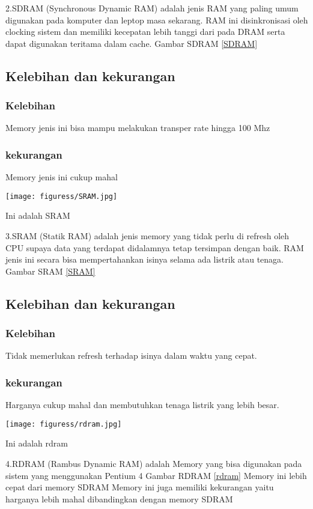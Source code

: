 2.SDRAM (Synchronous Dynamic RAM) adalah jenis RAM yang paling umum digunakan pada komputer dan leptop masa sekarang. RAM ini disinkronisasi oleh clocking sistem dan memiliki kecepatan lebih tanggi dari pada DRAM serta dapat digunakan teritama dalam cache.
Gambar SDRAM \ref{SDRAM}
    \subsection{Kelebihan dan kekurangan}
    \subsubsection{Kelebihan}
    \-Memory jenis ini bisa mampu melakukan transper rate hingga 100 Mhz
    \subsubsection{kekurangan}
    \-Memory jenis ini cukup mahal

  \begin{figures}[ht]
  \centerline{\texttt{[image: figuress/SRAM.jpg]}}
  \caption{Ini adalah SRAM}
  \label{SRAM}
  \end{figures}

3.SRAM (Statik RAM) adalah jenis memory yang tidak perlu di refresh oleh CPU supaya data yang terdapat didalamnya tetap tersimpan dengan baik.
RAM jenis ini secara bisa mempertahankan isinya selama ada listrik atau tenaga.
Gambar SRAM \ref{SRAM}
  \subsection{Kelebihan dan kekurangan}
    \subsubsection{Kelebihan}
    \-Tidak memerlukan refresh terhadap isinya dalam waktu yang cepat.
    \subsubsection{kekurangan}
    \-Harganya cukup mahal dan membutuhkan tenaga listrik yang lebih besar.

  \begin{figures}[ht]
  \centerline{\texttt{[image: figuress/rdram.jpg]}}
  \caption{Ini adalah rdram}
  \label{rdram}
  \end{figures}

4.RDRAM (Rambus Dynamic RAM) adalah Memory yang bisa digunakan pada sistem yang menggunakan Pentium 4
Gambar RDRAM \ref{rdram}
    \-Memory ini lebih cepat dari memory SDRAM
    \-Memory ini juga memiliki kekurangan yaitu harganya lebih mahal dibandingkan dengan memory SDRAM

